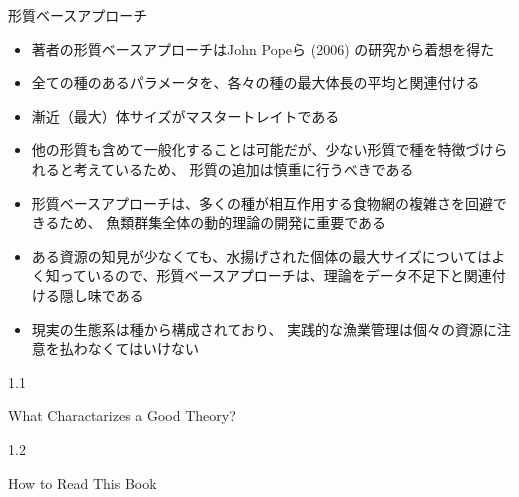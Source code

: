 \documentclass[
  ignorenonframetext,
]{beamer}
\providecommand{\tightlist}{%
  \setlength{\itemsep}{0pt}\setlength{\parskip}{0pt}}
\begin{document}
\begin{frame}{形質ベースアプローチ}
\protect\hypertarget{ux5f62ux8ceaux30d9ux30fcux30b9ux30a2ux30d7ux30edux30fcux30c1}{}

\begin{itemize}
\tightlist
\item
  著者の形質ベースアプローチはJohn Popeら (2006) の研究から着想を得た\\
  \vspace{3mm}
\item
  全ての種のあるパラメータを、各々の種の最大体長の平均と関連付ける
  \vspace{3mm}
\item
  漸近（最大）体サイズがマスタートレイトである \vspace{3mm}
\item
  他の形質も含めて一般化することは可能だが、少ない形質で種を特徴づけられると考えているため、
  形質の追加は慎重に行うべきである\\
  \vspace{3mm}
\item
  形質ベースアプローチは、多くの種が相互作用する食物網の複雑さを回避できるため、
  魚類群集全体の動的理論の開発に重要である\\
  \vspace{3mm}
\item
  ある資源の知見が少なくても、水揚げされた個体の最大サイズについてはよく知っているので、形質ベースアプローチは、理論をデータ不足下と関連付ける隠し味である\\
  \vspace{3mm}
\item
  現実の生態系は種から構成されており、
  実践的な漁業管理は個々の資源に注意を払わなくてはいけない
\end{itemize}

\end{frame}

\begin{frame}

\begin{LARGE} 
\begin{center}
\begin{bf}
1.1   
  
What Charactarizes a Good Theory?
\end{bf}
\end{center}
\end{LARGE}

\end{frame}

\begin{frame}

\begin{LARGE} 
\begin{center}
\begin{bf}
1.2   
  
How to Read This Book
\end{bf}
\end{center}
\end{LARGE}

\end{frame}
\end{document}
